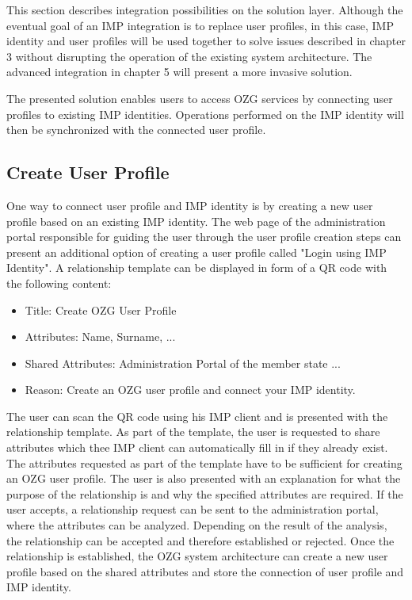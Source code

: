 This section describes integration possibilities on the solution layer.
Although the eventual goal of an IMP integration is to replace user profiles, in this case, IMP identity and user profiles will be used together to solve issues described in chapter 3 without disrupting the operation of the existing system architecture. The advanced integration in chapter 5 will present a more invasive solution.

The presented solution enables users to access OZG services by connecting user profiles to existing IMP identities. Operations performed on the IMP identity will then be synchronized with the connected user profile.

\subsection{Create User Profile}
One way to connect user profile and IMP identity is by creating a new user profile based on an existing IMP identity. The web page of the administration portal responsible for guiding the user through the user profile creation steps can present an additional option of creating a user profile called "Login using IMP Identity". A relationship template can be displayed in form of a QR code with the following content:

\begin{itemize}
    \item Title: Create OZG User Profile
    \item Attributes: Name, Surname, ... 
    \item Shared Attributes: Administration Portal of the member state ...
    \item Reason: Create an OZG user profile and connect your IMP identity.
\end{itemize}

The user can scan the QR code using his IMP client and is presented with the relationship template. As part of the template, the user is requested to share attributes which thee IMP client can automatically fill in if they already exist. The attributes requested as part of the template have to be sufficient for creating an OZG user profile.
The user is also presented with an explanation for what the purpose of the relationship is and why the specified attributes are required. If the user accepts, a relationship request can be sent to the administration portal, where the attributes can be analyzed. Depending on the result of the analysis, the relationship can be accepted and therefore established or rejected.
Once the relationship is established, the OZG system architecture can create a new user profile based on the shared attributes and store the connection of user profile and IMP identity.

